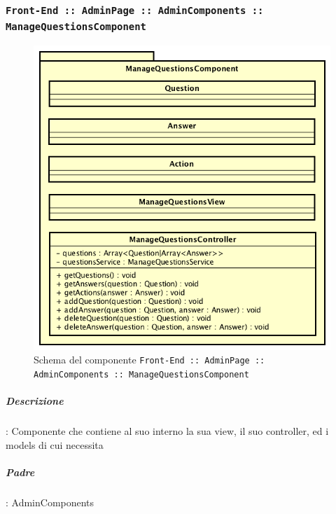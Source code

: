 \documentclass[../DefinizioneDiProdotto_v2.0.0.tex]{subfiles}
\begin{document}
	\subsubsection{\texttt{Front-End :: AdminPage :: AdminComponents :: ManageQuestionsComponent}}
	\begin{figure}[!h]
		\centering
		\includegraphics[scale=0.6]{Architettura/Front-End/AdminPage/AdminComponents/ManageQuestionsComponent.png}
		\caption{Schema del componente \texttt{Front-End :: AdminPage :: AdminComponents :: ManageQuestionsComponent}}
	\end{figure}
			\subparagraph{Descrizione}: Componente che contiene al suo interno la sua view, il suo controller, ed i models di cui necessita
			\subparagraph{Padre}: AdminComponents
\end{document}
